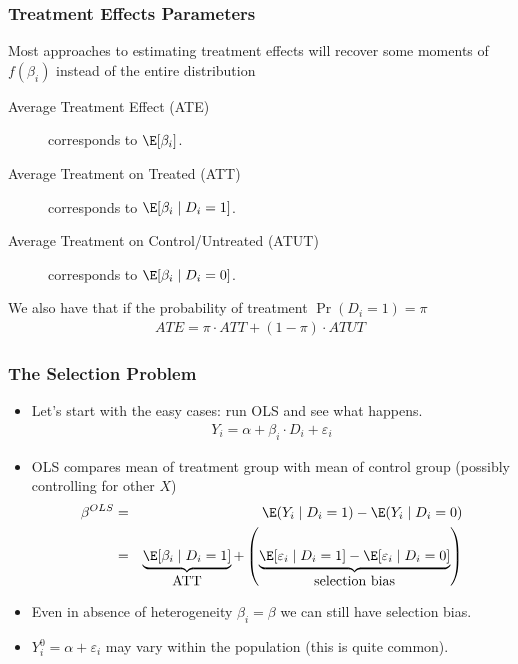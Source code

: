 \documentclass[aspectratio=169,11pt]{beamer}
\begin{document}
\begin{frame}
\frametitle{Treatment Effects Parameters}
Most approaches to estimating treatment effects will recover some moments of $f(\beta_i)$ instead of the entire distribution
\begin{description}
\item[Average Treatment Effect (ATE)] corresponds to $\E[\beta_i]$.
\item[Average Treatment on Treated (ATT)] corresponds to $\E[\beta_i \mid D_i = 1]$.
\item[Average Treatment on Control/Untreated (ATUT)] corresponds to $\E[\beta_i \mid D_i = 0]$.
\end{description}
We also have that if the probability of treatment $\Pr(D_i=1) = \pi$
\begin{align*}
ATE = \pi \cdot ATT + (1-\pi) \cdot ATUT
\end{align*}
\end{frame}


\begin{frame}
\frametitle{The Selection Problem}
\begin{itemize}
\item Let's start with the easy cases: run OLS and see what happens.
\begin{align*}
Y_i = \alpha + \beta_i \cdot D_i + \varepsilon_i
\end{align*}
\item OLS compares mean of treatment group with mean of control group (possibly controlling for other $X$)
\begin{eqnarray*}
\beta^{OLS} &=& \E(Y_i \mid D_i =1) - \E(Y_i \mid D_i=0) \\
&=& \underbrace{\E[\beta_i \mid  D_i =1]}_{\mbox{ATT}} + \left(\underbrace{\E[\varepsilon_i \mid D_i =1 ] - \E[\varepsilon_i \mid D_i=0] }_{\mbox{selection bias}}  \right)
\end{eqnarray*}
\item Even in absence of heterogeneity $\beta_i = \beta$ we can still have selection bias. 
\item $Y_i^0 = \alpha + \varepsilon_i$ may vary within the population (this is quite common).
\end{itemize}
\end{frame}
\end{document}
